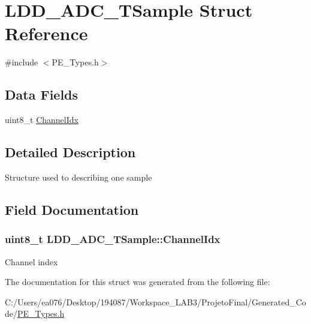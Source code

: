 \hypertarget{struct_l_d_d___a_d_c___t_sample}{\section{L\-D\-D\-\_\-\-A\-D\-C\-\_\-\-T\-Sample Struct Reference}
\label{struct_l_d_d___a_d_c___t_sample}
}


{\ttfamily \#include $<$P\-E\-\_\-\-Types.\-h$>$}

\subsection*{Data Fields}
\begin{DoxyCompactItemize}
\item 
uint8\-\_\-t \hyperlink{struct_l_d_d___a_d_c___t_sample_ae2737bdf799311a9bc9f7acf30f569c1}{Channel\-Idx}
\end{DoxyCompactItemize}


\subsection{Detailed Description}
Structure used to describing one sample 

\subsection{Field Documentation}
\hypertarget{struct_l_d_d___a_d_c___t_sample_ae2737bdf799311a9bc9f7acf30f569c1}{
\subsubsection[{Channel\-Idx}]{\setlength{\rightskip}{0pt plus 5cm}uint8\-\_\-t L\-D\-D\-\_\-\-A\-D\-C\-\_\-\-T\-Sample\-::\-Channel\-Idx}}\label{struct_l_d_d___a_d_c___t_sample_ae2737bdf799311a9bc9f7acf30f569c1}
Channel index 

The documentation for this struct was generated from the following file\-:\begin{DoxyCompactItemize}
\item 
C\-:/\-Users/ea076/\-Desktop/194087/\-Workspace\-\_\-\-L\-A\-B3/\-Projeto\-Final/\-Generated\-\_\-\-Code/\hyperlink{_p_e___types_8h}{P\-E\-\_\-\-Types.\-h}\end{DoxyCompactItemize}
